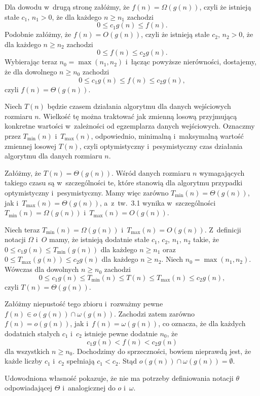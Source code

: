 Dla dowodu w~drugą stronę załóżmy, że $f(n)=\Omega(g(n))$, czyli że istnieją stałe $c_1$, $n_1>0$, że dla każdego $n\ge n_1$ zachodzi
\[
	0 \le c_1g(n) \le f(n).
\]
Podobnie załóżmy, że $f(n)=O(g(n))$, czyli że istnieją stałe $c_2$, $n_2>0$, że dla każdego $n\ge n_2$ zachodzi
\[
	0 \le f(n) \le c_2g(n).
\]
Wybierając teraz $n_0=\max(n_1,n_2)$ i~łącząc powyższe nierówności, dostajemy, że dla dowolnego $n\ge n_0$ zachodzi
\[
	0 \le c_1g(n) \le f(n) \le c_2g(n),
\]
czyli $f(n)=\Theta(g(n))$.

\exercise %
Niech $T(n)$ będzie czasem działania algorytmu dla danych wejściowych rozmiaru $n$.
Wielkość tę można traktować jak zmienną losową przyjmującą konkretne wartości w~zależności od egzemplarza danych wejściowych.
Oznaczmy przez $T_\mathrm{min}(n)$ i~$T_\mathrm{max}(n)$, odpowiednio, minimalną i~maksymalną wartość zmiennej losowej $T(n)$, czyli optymistyczny i~pesymistyczny czas działania algorytmu dla danych rozmiaru $n$.

Załóżmy, że $T(n)=\Theta(g(n))$.
Wśród danych rozmiaru $n$ wymagających takiego czasu są w~szczególności te, które stanowią dla algorytmu przypadki optymistyczny i~pesymistyczny.
Mamy więc zarówno $T_\mathrm{min}(n)=\Theta(g(n))$, jak i~$T_\mathrm{max}(n)=\Theta(g(n))$, a~z~tw.\ 3.1 wynika w~szczególności $T_\mathrm{min}(n)=\Omega(g(n))$ i~$T_\mathrm{max}(n)=O(g(n))$.

Niech teraz $T_\mathrm{min}(n)=\Omega(g(n))$ i~$T_\mathrm{max}(n)=O(g(n))$.
Z~definicji notacji $\Omega$ i~$O$ mamy, że istnieją dodatnie stałe $c_1$, $c_2$, $n_1$, $n_2$ takie, że $0\le c_1g(n)\le T_\mathrm{min}(g(n))$ dla każdego $n\ge n_1$ oraz $0\le T_\mathrm{max}(g(n))\le c_2g(n)$ dla każdego $n\ge n_2$.
Niech $n_0=\max(n_1,n_2)$.
Wówczas dla dowolnych $n\ge n_0$ zachodzi
\[
	0 \le c_1g(n) \le T_\mathrm{min}(n) \le T(n) \le T_\mathrm{max}(n) \le c_2g(n),
\]
czyli $T(n)=\Theta(g(n))$.

\exercise %
Załóżmy niepustość tego zbioru i~rozważmy pewne $f(n)\in o(g(n))\cap\omega(g(n))$.
Zachodzi zatem zarówno $f(n)=o(g(n))$, jak i~$f(n)=\omega(g(n))$, co oznacza, że dla każdych dodatnich stałych $c_1$ i~$c_2$ istnieje pewne dodatnie $n_0$, że
\[
	c_1g(n) < f(n) < c_2g(n)
\]
dla wszystkich $n\ge n_0$.
Dochodzimy do sprzeczności, bowiem nieprawdą jest, że każde liczby $c_1$ i~$c_2$ spełniają $c_1<c_2$.
Stąd $o(g(n))\cap\omega(g(n))=\emptyset$.

Udowodniona własność pokazuje, że nie ma potrzeby definiowania notacji $\theta$ odpowiadającej $\Theta$ i~analogicznej do $o$ i~$\omega$.

